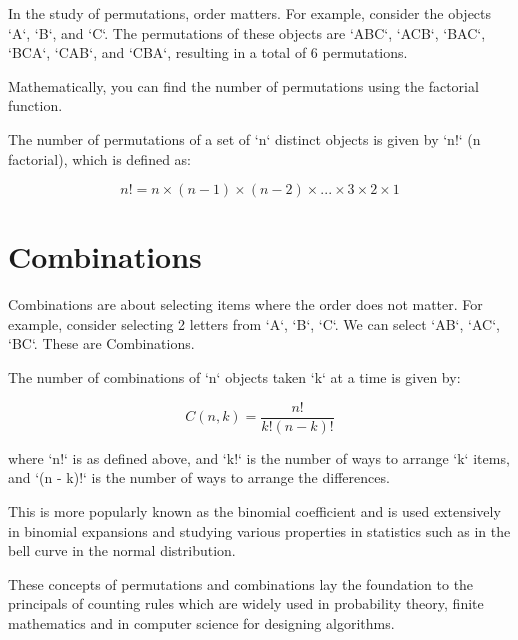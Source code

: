 In the study of permutations, order matters. For example, consider the objects `A`, `B`, and `C`. The permutations of these objects are `ABC`, `ACB`, `BAC`, `BCA`, `CAB`, and `CBA`, resulting in a total of 6 permutations.

Mathematically, you can find the number of permutations using the factorial function. 

The number of permutations of a set of `n` distinct objects is given by `n!` (n factorial), which is defined as:

\[ n! = n \times (n - 1) \times (n - 2) \times ... \times 3 \times 2 \times 1 \]

\section{Combinations}

Combinations are about selecting items where the order does not matter. For example, consider selecting 2 letters from `A`, `B`, `C`. We can select `AB`, `AC`, `BC`. These are Combinations.

The number of combinations of `n` objects taken `k` at a time is given by:

\[ C(n, k) = \frac{{n!}}{{k!(n - k)!}} \]

where `n!` is as defined above, and `k!` is the number of ways to arrange `k` items, and `(n - k)!` is the number of ways to arrange the differences.

This is more popularly known as the binomial coefficient and is used extensively in binomial expansions and studying various properties in statistics such as in the bell curve in the normal distribution. 

These concepts of permutations and combinations lay the foundation to the principals of counting rules which are widely used in probability theory, finite mathematics and in computer science for designing algorithms.

